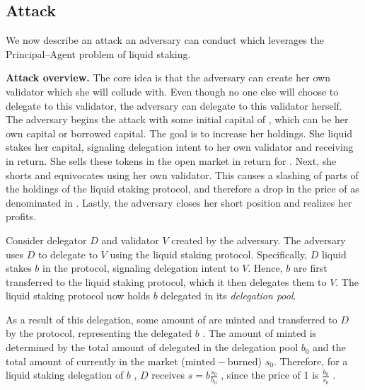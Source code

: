 \subsection{Attack}

We now describe an attack an adversary can conduct which leverages the
Principal--Agent problem of liquid staking.

\noindent
\textbf{Attack overview.}
The core idea is that the adversary can create her own validator
which she will collude with.
Even though no one else will choose to delegate to
this validator, the adversary can delegate to this validator herself.
The adversary begins the attack with some initial capital of \asset, which
can be her own capital or borrowed capital. The goal is to increase her
\asset holdings. She liquid stakes her capital, signaling delegation
intent to her own validator and receiving \stasset in return.
She sells these tokens in the open market in return for \asset.
Next, she shorts \stasset and equivocates using her own validator.
This causes a slashing of parts of the \asset holdings of the liquid
staking protocol, and therefore a drop in the price of \stasset
as denominated in \asset. Lastly, the adversary closes her short
position and realizes her profits.

Consider delegator $D$ and validator $V$ created by the adversary.
The adversary uses $D$ to delegate to $V$ using the liquid staking
protocol. Specifically, $D$ liquid stakes $b$ \asset in the protocol,
signaling delegation intent to $V$. Hence, $b$ \asset are first
transferred to the liquid staking protocol, which it then delegates them
to $V$. The liquid staking protocol now holds $b$ delegated \asset in
its \emph{delegation pool}.

As a result of this delegation, some amount
of \stasset are minted and transferred to $D$ by the protocol,
representing the delegated $b$ \asset.
The amount of \stasset minted is determined by
the total amount of delegated \asset in the delegation pool $b_0$ and
the total amount of \stasset currently in the market
($\mathrm{minted} - \mathrm{burned}$) $s_0$. Therefore, for a
liquid staking delegation of $b$ \asset, $D$ receives
$s = b \frac{s_0}{b_0}$ \stasset, since the price of 1 \stasset is
$\frac{b_0}{s_0}$ \asset.



